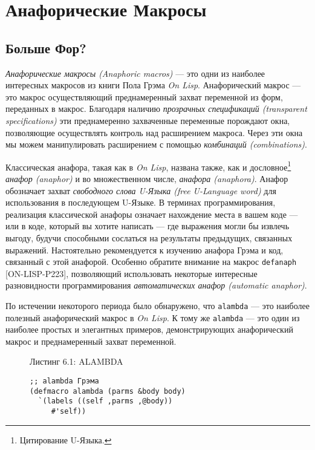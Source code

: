\chapter{Анафорические Макросы}\label{chapter_anaphoric_macros}
\section{Больше Фор?}\label{section_more_phors?}


\emph{Анафорические макросы (Anaphoric macros)} --- это одни из наиболее интересных макросов из книги Пола Грэма \emph{On Lisp}. Анафорический макрос --- это макрос осуществляющий преднамеренный захват переменной из форм, переданных в макрос. Благодаря наличию \emph{прозрачных спецификаций (transparent specifications)} эти преднамеренно захваченные переменные порождают окна, позволяющие осуществлять контроль над расширением макроса. Через эти окна мы можем манипулировать расширением с помощью \emph{комбинаций (combinations)}.

Классическая анафора, такая как в \emph{On Lisp}, названа также, как и дословное\footnote{Цитирование U-Языка.} \emph{анафор (anaphor)} и во множественном числе, \emph{анафора (ana\-pho\-ra)}. Анафор обозначает захват \emph{свободного слова U-Языка (free U-Language word)} для использования в последующем U-Языке. В терминах программирования, реализация классической анафоры означает нахождение места в вашем коде --- или в коде, который вы хотите написать --- где выражения могли бы извлечь выгоду, будучи способными сослаться на результаты предыдущих, связанных выражений. Настоятельно рекомендуется к изучению анафора Грэма и код, связанный с этой анафорой. Особенно обратите внимание на макрос \verb"defanaph" [ON-LISP-P223], позволяющий использовать некоторые интересные разновидности программирования \emph{автоматических анафор (automatic anaphor)}.



По истечении некоторого периода было обнаружено, что \verb"alambda" --- это наиболее полезный анафорический макрос в \emph{On Lisp}. К тому же \verb"alambda" --- это один из наиболее простых и элегантных примеров, демонстрирующих анафорический макрос и преднамеренный захват переменной.

\begin{figure}Листинг 6.1: ALAMBDA\label{listing_6.1}
\listbegin
\begin{verbatim}
;; alambda Грэма
(defmacro alambda (parms &body body)
  `(labels ((self ,parms ,@body))
     #'self))
\end{verbatim}
\listend
\end{figure}

